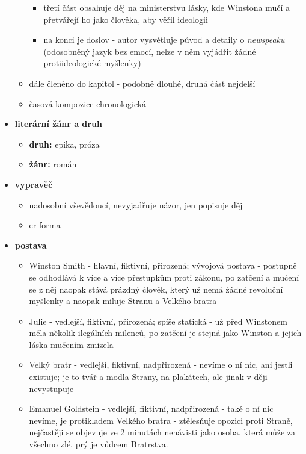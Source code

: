 \documentclass[11pt]{article}
\begin{document}
\begin{itemize}
\begin{itemize}
\begin{itemize}
                \item třetí část obsahuje děj na ministerstvu lásky, kde Winstona mučí a přetvářejí ho jako člověka, aby věřil ideologii
                \item na konci je doslov - autor vysvětluje původ a detaily o \textit{newspeaku} (odosobněný jazyk bez emocí, nelze v něm vyjádřit žádné protiideologické myšlenky)
            \end{itemize}
            \item dále členěno do kapitol - podobně dlouhé, druhá část nejdelší
            \item časová kompozice chronologická
        \end{itemize}
        \item\textbf{literární žánr a druh}
        \begin{itemize}
            \item \textbf{druh: }epika, próza
            \item \textbf{žánr: }román
        \end{itemize}
        \item\textbf{vypravěč}
        \begin{itemize}
            \item nadosobní vševědoucí, nevyjadřuje názor, jen popisuje děj
            \item er-forma
        \end{itemize}
        \item\textbf{postava}
        \begin{itemize}
            \item Winston Smith - hlavní, fiktivní, přirozená; vývojová postava - postupně se odhodlává k více a více přestupkům proti zákonu, po zatčení a mučení se z něj naopak stává prázdný člověk, který už nemá žádné revoluční myšlenky a naopak miluje Stranu a Velkého bratra
            \item Julie - vedlejší, fiktivní, přirozená; spíše statická - už před Winstonem měla několik ilegálních milenců, po zatčení je stejná jako Winston a jejich láska mučením zmizela
            \item Velký bratr - vedlejší, fiktivní, nadpřirozená - nevíme o ní nic, ani jestli existuje; je to tvář a modla Strany, na plakátech, ale jinak v ději nevystupuje
            \item Emanuel Goldstein - vedlejší, fiktivní, nadpřirozená - také o ní nic nevíme, je protikladem Velkého bratra - ztělesňuje opozici proti Straně, nejčastěji se objevuje ve 2 minutách nenávisti jako osoba, která může za všechno zlé, prý je vůdcem Bratrstva.

\end{itemize}
\end{itemize}
\end{document}

